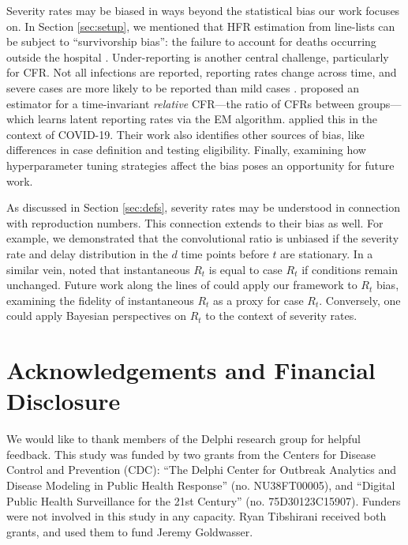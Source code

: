 \documentclass{article}
\begin{document}
Severity rates may be biased in ways beyond the statistical bias our work
focuses on. In Section \ref{sec:setup}, we mentioned that HFR estimation from
line-lists can be subject to ``survivorship bias'': the failure to account for 
deaths occurring outside the hospital \citep{lipsitch2015potential}.
Under-reporting is another central challenge, particularly for CFR. Not all
infections are reported, reporting rates change across time, and severe cases
are more likely to be reported than mild cases \citep{Tsang2021}. \citet{reich2012estimating}
proposed an estimator for a time-invariant \emph{relative} CFR---the ratio of
CFRs between groups---which learns latent reporting rates via the EM
algorithm. \citet{anastasios} applied this in the context of COVID-19. Their
work also identifies other sources of bias, like differences in case definition
and testing eligibility.  
Finally, examining how hyperparameter tuning strategies affect the bias poses an opportunity for future work.

As discussed in Section \ref{sec:defs}, severity rates may be understood in
connection with reproduction numbers. This connection extends to their bias as
well. For example, we  demonstrated that the convolutional ratio is unbiased if
the severity rate and delay distribution in the $d$ time points before $t$ are 
stationary. In a similar vein, \citet{fraser2007} noted that instantaneous $R_t$
is equal to case $R_t$ if conditions remain unchanged. Future work along the
lines of \citet{rt_study} could apply our framework to $R_t$ bias, examining the
fidelity of instantaneous $R_t$ as a proxy for case $R_t$.   
Conversely, one could apply Bayesian perspectives on $R_t$ to the context of severity rates.



\section*{Acknowledgements and Financial Disclosure}

We would like to thank members of the Delphi research group for helpful
feedback. 
This study was funded by two grants from the Centers for Disease Control and Prevention (CDC): ``The Delphi Center for Outbreak Analytics and Disease Modeling in Public Health Response'' (no. NU38FT00005), and ``Digital Public Health Surveillance for the 21st Century'' (no. 75D30123C15907). Funders were not involved in this study in any capacity. Ryan Tibshirani received both grants, and used them to fund Jeremy Goldwasser. 



\end{document}
